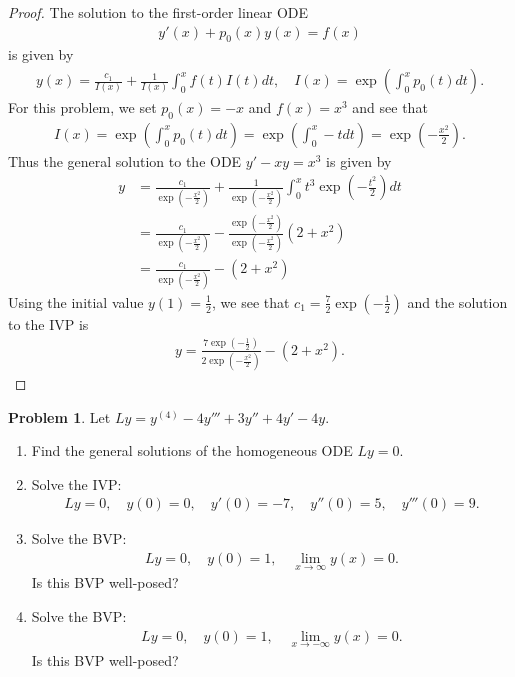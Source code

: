 \documentclass[12pt]{article}
\theoremstyle{definition}
\newtheorem{problem}{Problem}
\begin{document}
\begin{proof}
  The solution to the first-order linear ODE
  \begin{align*}
    y'(x) + p_0(x)y(x) = f(x)
  \end{align*}
  is given by
  \begin{align*}
    y(x) = \frac{c_1}{I(x)} + \frac{1}{I(x)} \int_0^x f(t)I(t)dt, \quad I(x) = \exp{\left(\int_0^x p_0(t) dt\right)}.
  \end{align*}
  For this problem, we set $p_0(x) = -x$ and $f(x) = x^3$ and see that
  \begin{align*}
    I(x) = \exp{\left(\int_0^x p_0(t) dt\right)} = \exp{\left(\int_0^x -t dt \right)} = \exp{\left(-\frac{x^2}{2}\right)}.
  \end{align*}
  Thus the general solution to the ODE $y' - xy = x^3$ is given by
  \begin{align*}
    y &= \frac{c_1}{\exp{\left(-\frac{x^2}{2}\right)}} + \frac{1}{\exp{\left(-\frac{x^2}{2}\right)}}\int_0^x t^3 \exp{\left(-\frac{t^2}{2}\right)}dt \\
    &= \frac{c_1}{\exp{\left(-\frac{x^2}{2}\right)}} - \frac{\exp{\left(-\frac{x^2}{2}\right)}}{\exp{\left(-\frac{x^2}{2}\right)}}(2 + x^2) \\
    &= \frac{c_1}{\exp{\left(-\frac{x^2}{2}\right)}} - (2+x^2)
  \end{align*}
  Using the initial value $y(1) = \frac{1}{2}$, we see that $c_1 = \frac{7}{2}\exp{\left(-\frac{1}{2}\right)}$
  and the solution to the IVP is
  \begin{align*}
    y = \frac{7\exp{\left(-\frac{1}{2}\right)}}{2\exp{\left(-\frac{x^2}{2}\right)}} - (2 + x^2).
  \end{align*}
\end{proof}
\newpage


\begin{problem}
  Let $Ly = y^{(4)} - 4 y''' + 3y'' +4y' -4y$.
  \begin{enumerate}
    \item Find the general solutions of the homogeneous ODE $Ly = 0$.
    \item Solve the IVP:
      \begin{align*}
        Ly = 0,\quad y(0) = 0, \quad y'(0)= -7, \quad y''(0) = 5, \quad y'''(0) = 9.
      \end{align*}
    \item Solve the BVP:
      \begin{align*}
        Ly = 0,\quad y(0) = 1, \quad \lim_{x\to\infty}y(x) = 0.
      \end{align*}
      Is this BVP well-posed?
    \item Solve the BVP:
      \begin{align*}
        Ly = 0,\quad y(0) = 1, \quad \lim_{x\to-\infty}y(x) = 0.
      \end{align*}
      Is this BVP well-posed?
  \end{enumerate}
\end{problem}
\end{document}
